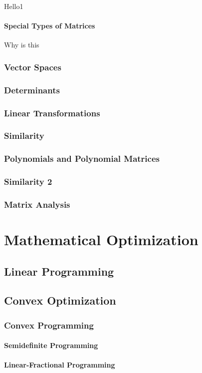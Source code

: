 \documentclass[10pt,legalpaper]{book}
\theoremstyle{definition}
\theoremstyle{plain}
\theoremstyle{remark}
\begin{document}
Hello1
\subsection{Special Types of Matrices}
Why is this
\section{Vector Spaces}
\section{Determinants}
\section{Linear Transformations}
\section{Similarity}
\section{Polynomials and Polynomial Matrices}
\section{Similarity 2}
\section{Matrix Analysis}

\part{Mathematical Optimization}
\chapter{Linear Programming}
\chapter{Convex Optimization}
\section{Convex Programming}
\subsection{Semidefinite Programming}
\subsection{Linear-Fractional Programming}
\end{document}
